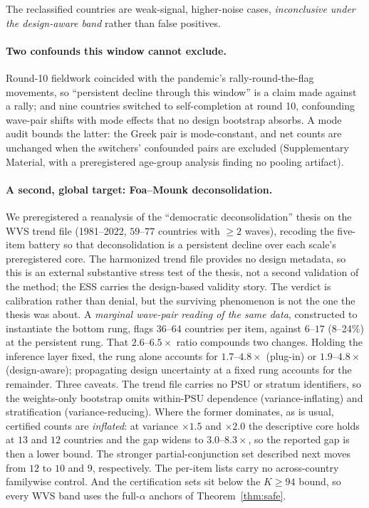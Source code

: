 The reclassified countries are weak-signal, higher-noise cases,
\emph{inconclusive under the design-aware band} rather than false positives.

\paragraph{Two confounds this window cannot exclude.} Round-10 fieldwork
coincided with the pandemic's rally-round-the-flag movements, so ``persistent
decline through this window'' is a claim made against a rally; and nine
countries switched to self-completion at round 10, confounding wave-pair
shifts with mode effects that no design bootstrap absorbs. A mode audit
bounds the latter: the Greek pair is mode-constant, and net counts are
unchanged when the switchers' confounded pairs are excluded (Supplementary
Material, with a preregistered age-group analysis finding no pooling
artifact).

\paragraph{A second, global target: Foa--Mounk deconsolidation.} We
preregistered a reanalysis of the ``democratic deconsolidation'' thesis
\citep{foa2016democratic,foa2017signs} on the WVS trend file (1981--2022,
$59$--$77$ countries with $\ge2$ waves), recoding the five-item battery so
that deconsolidation is a persistent decline over each scale's preregistered
core. The harmonized trend file provides no design metadata, so this is an
external substantive stress test of the thesis, not a second validation of
the method; the ESS carries the design-based validity
story. The verdict is calibration rather than denial, but the surviving
phenomenon is not the one the thesis was about. A \emph{marginal wave-pair
reading of the same data}, constructed to instantiate the bottom rung, flags
$36$--$64$ countries per item, against $6$--$17$ (8--24\%) at the persistent
rung. That $2.6$--$6.5\times$ ratio compounds two changes. Holding the
inference layer fixed, the rung alone accounts for $1.7$--$4.8\times$
(plug-in) or $1.9$--$4.8\times$ (design-aware); propagating design
uncertainty at a fixed rung accounts for the remainder. Three caveats. The trend file carries no PSU or stratum identifiers, so the
weights-only bootstrap omits within-PSU dependence (variance-inflating) and
stratification (variance-reducing). Where the former
dominates, as is usual, certified counts are \emph{inflated}: at variance
$\times1.5$ and $\times2.0$ the descriptive core holds at $13$ and $12$
countries and the gap widens to $3.0$--$8.3\times$, so the reported gap is
then a lower bound. The stronger partial-conjunction set described next moves
from $12$ to $10$ and $9$, respectively. The per-item lists carry no
across-country familywise control. And
the certification sets sit below the $K\ge94$ bound, so every WVS band uses
the full-$\alpha$ anchors of Theorem~\ref{thm:safe}.

